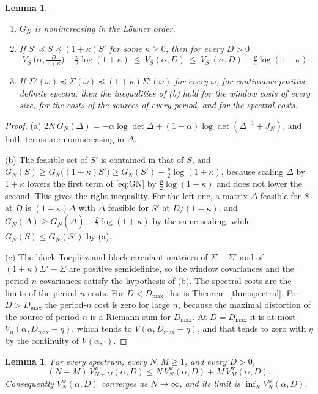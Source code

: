 \documentclass[11pt,onecolumn]{IEEEtran}
\newtheorem{lemma}[theorem]{Lemma}
\begin{document}
\begin{lemma}\label{lem:order}
\begin{enumerate}
\item[(a)] $G_N$ is nonincreasing in the L\"owner order.
\item[(b)] If $S'\preceq S\preceq(1+\kappa)S'$ for some $\kappa\ge0$,
then for every $D>0$
\[
V_{S'}\bigl(\alpha,\tfrac{D}{1+\kappa}\bigr)-\tfrac p2\log(1+\kappa)\ \le\ V_S(\alpha,D)\ \le\ V_{S'}(\alpha,D)+\tfrac p2\log(1+\kappa).
\]
\item[(c)] If $\Sigma'(\omega)\preceq\Sigma(\omega)\preceq(1+\kappa)\Sigma'(\omega)$
for every $\omega$, for continuous positive definite spectra, then the
inequalities of (b) hold for the window costs of every size, for the
costs of the sources of every period, and for the spectral costs.
\end{enumerate}
\end{lemma}

\begin{proof}
(a) $2N\,G_N(\Delta)=-\alpha\log\det\Delta+(1-\alpha)\log\det(\Delta^{-1}+J_N)$,
and both terms are nonincreasing in $\Delta$.

(b) The feasible set of $S'$ is contained in that of $S$, and
$G_N(S)\ge G_N\bigl((1+\kappa)S'\bigr)\ge G_N(S')-\tfrac p2\log(1+\kappa)$,
because scaling $\Delta$ by $1+\kappa$ lowers the first term of
\eqref{eq:GN} by $\tfrac p2\log(1+\kappa)$ and does not lower the second.
This gives the right inequality. For the left one, a matrix $\Delta$
feasible for $S$ at $D$ is $(1+\kappa)\tilde\Delta$ with $\tilde\Delta$
feasible for $S'$ at $D/(1+\kappa)$, and
$G_N(\Delta)\ge G_N(\tilde\Delta)-\tfrac p2\log(1+\kappa)$ by the same
scaling, while $G_N(S)\le G_N(S')$ by (a).

(c) The block-Toeplitz and block-circulant matrices of
$\Sigma-\Sigma'$ and of $(1+\kappa)\Sigma'-\Sigma$ are positive
semidefinite, so the window covariances and the period-$n$ covariances
satisfy the hypothesis of (b). The spectral costs are the limits of the
period-$n$ costs. For $D<D_{\max}$ this is
Theorem~\ref{thm:spectral}. For $D>D_{\max}$ the period-$n$ cost is zero
for large $n$, because the maximal distortion of the source of period
$n$ is a Riemann sum for $D_{\max}$. At $D=D_{\max}$ it is at most
$V_n(\alpha,D_{\max}-\eta)$, which tends to $V(\alpha,D_{\max}-\eta)$, and
that tends to zero with $\eta$ by the continuity of $V(\alpha,\cdot)$.
\end{proof}

\begin{lemma}\label{lem:subadd}
For every spectrum, every $N,M\ge1$, and every $D>0$,
\[
(N+M)\,V^{\mathrm w}_{N+M}(\alpha,D)\le N\,V^{\mathrm w}_N(\alpha,D)+M\,V^{\mathrm w}_M(\alpha,D).
\]
Consequently $V^{\mathrm w}_N(\alpha,D)$ converges as $N\to\infty$, and
its limit is $\inf_NV^{\mathrm w}_N(\alpha,D)$.
\end{lemma}
\end{document}
